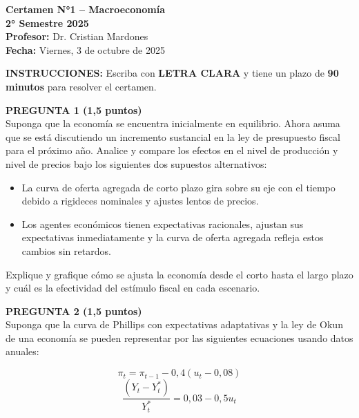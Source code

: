 \documentclass[11pt,addpoints]{article}
\begin{document}
\vspace*{0.1cm}

\begin{center}
{\Large \bfseries Certamen N°1 – Macroeconomía \\[0.25cm]}
\textbf{2° Semestre 2025}\\[0.3cm]
\textbf{Profesor:} Dr. Cristian Mardones\\[0.2cm]
\textbf{Fecha:} Viernes, 3 de octubre de 2025
\end{center}

\vspace{0.4cm}
\textbf{INSTRUCCIONES:} Escriba con \textbf{LETRA CLARA} y tiene un plazo de \textbf{90 minutos} para resolver el certamen.

\vspace{0.6cm}

\textbf{PREGUNTA 1 (1,5 puntos)}\\[0.3cm]
Suponga que la economía se encuentra inicialmente en equilibrio. Ahora asuma que se está discutiendo un incremento sustancial en la ley de presupuesto fiscal para el próximo año. Analice y compare los efectos en el nivel de producción y nivel de precios bajo los siguientes dos supuestos alternativos:

\begin{itemize}
  \item La curva de oferta agregada de corto plazo gira sobre su eje con el tiempo debido a rigideces nominales y ajustes lentos de precios.
  \item Los agentes económicos tienen expectativas racionales, ajustan sus expectativas inmediatamente y la curva de oferta agregada refleja estos cambios sin retardos.
\end{itemize}

Explique y grafique cómo se ajusta la economía desde el corto hasta el largo plazo y cuál es la efectividad del estímulo fiscal en cada escenario.

\vspace{0.8cm}

\textbf{PREGUNTA 2 (1,5 puntos)}\\[0.3cm]
Suponga que la curva de Phillips con expectativas adaptativas y la ley de Okun de una economía se pueden representar por las siguientes ecuaciones usando datos anuales:

\[
\pi_t = \pi_{t-1} - 0{,}4(u_t - 0{,}08)
\]
\[
\frac{(Y_t - Y_t^*)}{Y_t^*} = 0{,}03 - 0{,}5u_t
\]
\end{document}
